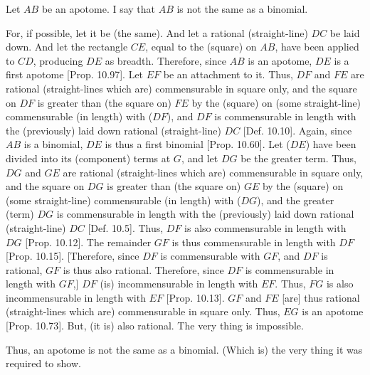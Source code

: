 \begin{Parallel}{}{}
{Let $AB$ be an apotome. I say that $AB$ is not the same as a binomial.

For, if possible, let it be (the same). And let a rational (straight-line)
$DC$ be laid down. And let the rectangle $CE$, equal to the (square) on $AB$, have been applied to $CD$, producing $DE$ as breadth. Therefore,
since $AB$ is an apotome, $DE$ is a first apotome [Prop. 10.97]. Let $EF$ be an attachment to it.
Thus, $DF$ and $FE$ are rational (straight-lines which are) commensurable
in square only, and the square on $DF$ is greater than (the square on)
$FE$ by the (square) on (some straight-line) commensurable (in length)
with ($DF$), and $DF$ is commensurable in length with the (previously)
laid down rational (straight-line) $DC$ [Def. 10.10]. 
Again, since $AB$ is a binomial, $DE$ is thus a first binomial [Prop. 10.60]. Let ($DE$) have been divided
into its (component) terms at $G$, and let $DG$ be the greater term.
Thus, $DG$ and $GE$ are rational (straight-lines which are)
commensurable in square only, and the square on $DG$ is greater
than (the square on) $GE$ by the (square) on (some straight-line)
commensurable (in length) with ($DG$), and the greater (term)
$DG$ is commensurable in length with the (previously)
laid down rational (straight-line) $DC$ [Def. 10.5].
Thus, $DF$ is also commensurable in length with $DG$ [Prop. 10.12].
The remainder $GF$ is thus commensurable in length with $DF$
[Prop. 10.15]. [Therefore, since
$DF$ is commensurable with $GF$, and $DF$ is rational, $GF$
is thus also rational. Therefore, since $DF$ is commensurable
in length with $GF$,] $DF$ (is) incommensurable in length with $EF$.
Thus, $FG$ is also incommensurable in length with $EF$ [Prop. 10.13]. $GF$ and $FE$ [are] thus
rational (straight-lines which are) commensurable in square only.
Thus, $EG$ is an apotome [Prop. 10.73].
But, (it is) also rational. The very thing is impossible.

Thus, an apotome is not the same as a binomial. (Which is) the very thing
it was required to show.}
\end{Parallel}

